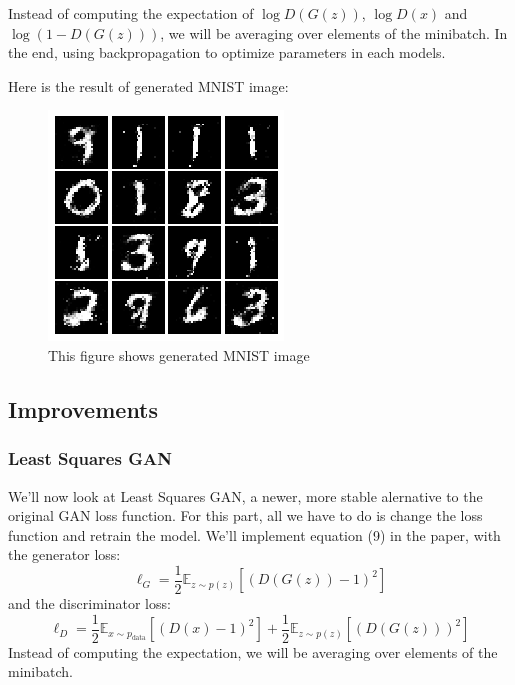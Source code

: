 \documentclass[10pt,twocolumn,letterpaper]{article}
\begin{document}
Instead of computing the expectation of $\log D(G(z))$, $\log D(x)$ and $\log \left(1-D(G(z))\right)$, we will be averaging over elements of the minibatch. In the end, using backpropagation to optimize parameters in each models.

Here is the result of generated MNIST image: 
\begin{figure}[htpb]
\begin{center}
   \includegraphics[scale=1]{images/gan.png}
\end{center}
   \caption{\footnotesize This figure shows generated MNIST image}
\end{figure}

\subsection{Improvements}
\subsubsection{Least Squares GAN}
We'll now look at Least Squares GAN\cite{DBLP:journals/corr/MaoLXLW16}, a newer, more stable alernative to the original GAN loss function. For this part, all we have to do is change the loss function and retrain the model. We'll implement equation (9) in the paper, with the generator loss:
$$\ell_G  =  \frac{1}{2}\mathbb{E}_{z \sim p(z)}\left[\left(D(G(z))-1\right)^2\right]$$
and the discriminator loss:
$$ \ell_D = \frac{1}{2}\mathbb{E}_{x \sim p_\text{data}}\left[\left(D(x)-1\right)^2\right] + \frac{1}{2}\mathbb{E}_{z \sim p(z)}\left[ \left(D(G(z))\right)^2\right]$$
Instead of computing the expectation, we will be averaging over elements of the minibatch.
\end{document}
